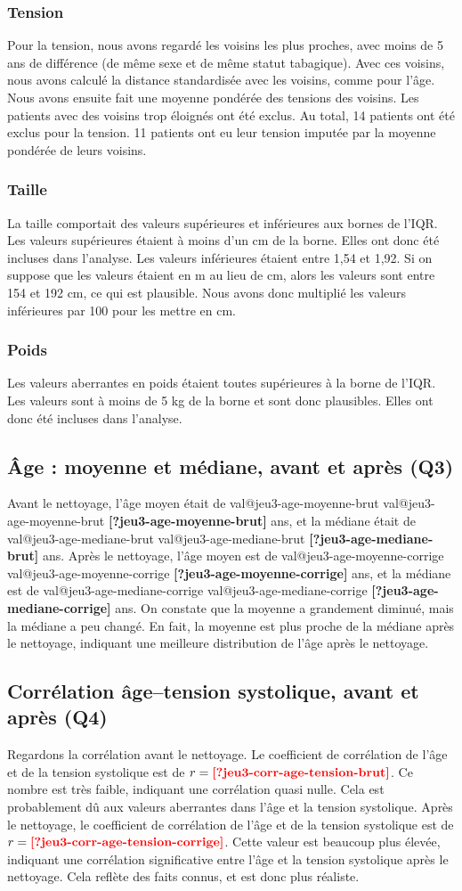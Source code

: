\documentclass[11pt,letterpaper]{article}
\makeatletter
\newcommand{\val}[1]{%
  \ifcsname val@#1\endcsname
    \csname val@#1\endcsname
  \else
    {\color{red}\textbf{[?#1]}}%
  \fi}
\makeatother
\begin{document}
\subsubsection{Tension}
Pour la tension, nous avons regardé les voisins les plus proches, avec moins de 5 ans de différence (de même sexe et de même statut tabagique).
Avec ces voisins, nous avons calculé la distance standardisée avec les voisins, comme pour l'âge.
Nous avons ensuite fait une moyenne pondérée des tensions des voisins.
Les patients avec des voisins trop éloignés ont été exclus.
Au total, 14 patients ont été exclus pour la tension.
11 patients ont eu leur tension imputée par la moyenne pondérée de leurs voisins.
\subsubsection{Taille}
La taille comportait des valeurs supérieures et inférieures aux bornes de l'IQR.
Les valeurs supérieures étaient à moins d'un cm de la borne.
Elles ont donc été incluses dans l'analyse.
Les valeurs inférieures étaient entre 1,54 et 1,92.
Si on suppose que les valeurs étaient en m au lieu de cm, alors les valeurs sont entre 154 et 192 cm, ce qui est plausible.
Nous avons donc multiplié les valeurs inférieures par 100 pour les mettre en cm.
\subsubsection{Poids}
Les valeurs aberrantes en poids étaient toutes supérieures à la borne de l'IQR.
Les valeurs sont à moins de 5 kg de la borne et sont donc plausibles.
Elles ont donc été incluses dans l'analyse.

\subsection{Âge : moyenne et médiane, avant et après (Q3)}
Avant le nettoyage, l'âge moyen était de \val{jeu3-age-moyenne-brut} ans, et la médiane était de \val{jeu3-age-mediane-brut} ans.
Après le nettoyage, l'âge moyen est de \val{jeu3-age-moyenne-corrige} ans, et la médiane est de \val{jeu3-age-mediane-corrige} ans.
On constate que la moyenne a grandement diminué, mais la médiane a peu changé.
En fait, la moyenne est plus proche de la médiane après le nettoyage, indiquant une meilleure distribution de l'âge après le nettoyage.

\subsection{Corrélation âge--tension systolique, avant et après (Q4)}
Regardons la corrélation avant le nettoyage.
Le coefficient de corrélation de l'âge et de la tension systolique est de $r = \val{jeu3-corr-age-tension-brut}$.
Ce nombre est très faible, indiquant une corrélation quasi nulle.
Cela est probablement dû aux valeurs aberrantes dans l'âge et la tension systolique.
Après le nettoyage, le coefficient de corrélation de l'âge et de la tension systolique est de $r = \val{jeu3-corr-age-tension-corrige}$.
Cette valeur est beaucoup plus élevée, indiquant une corrélation significative entre l'âge et la tension systolique après le nettoyage.
Cela reflète des faits connus, et est donc plus réaliste.
\end{document}
